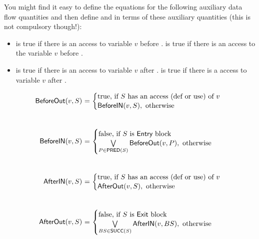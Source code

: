 \documentclass[12pt]{article}
\newcommand{\answer}[1]{{{\blue #1}}}
\begin{document}
\begin{enumerate}
\begin{enumerate}
You might find it easy to define the equations for the following
auxiliary data flow quantities and then define  and
 in terms of these auxiliary quantities (this is not
compulsory though!):
\begin{itemize}
\item {} is true if there is an access to variable $v$
  before .   is true if there is an access to
  the variable $v$ before .
\item {} is true if there is an access to variable $v$
  after .  is true if there is a access to
  variable $v$ after .
\end{itemize}
\answer{

\[\begin{array}{r@{\ }c@{\ }l}
  \outdef{v}{S} &=& \left\{\renewcommand{\arraystretch}{1.1}
  \begin{array}{@{}l}
    \mbox{true, if $S$ has an access (def or use) of $v$}\\
    \indef{v}{S},\  \mbox{otherwise}
  \end{array}\right. \\ \\ \\
  \indef{v}{S} &=& \left\{\renewcommand{\arraystretch}{1.1}
  \begin{array}{@{}l}
    \mbox{false, if $S$ is \fgentry\ block}\\
    \bigvee\limits_{P \in \Pred{S}}%
    \outdef{v}{P},\ \mbox{otherwise}
  \end{array}\right. \\ \\ \\
  \inuse{v}{S} &=& \left\{\renewcommand{\arraystretch}{1.1}
  \begin{array}{@{}l}
    \mbox{true, if $S$ has an access (def or use) of $v$}\\
    \outuse{v}{S},\  \mbox{otherwise}
  \end{array}\right. \\ \\ \\
  \outuse{v}{S} &=& \left\{\renewcommand{\arraystretch}{1.1}
  \begin{array}{@{}l}
    \mbox{false, if $S$ is \fgexit\ block}\\
    \bigvee\limits_{BS \in \Succ{S}} %
    \inuse{v}{BS},\ \mbox{otherwise}
  \end{array}\right.
\end{array}\]

}
\end{enumerate}
\end{enumerate}
\end{document}
